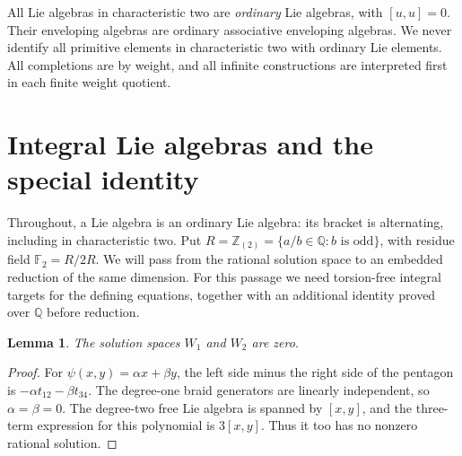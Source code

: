 \documentclass[11pt]{article}
\newcommand{\Q}{\mathbb Q}
\newcommand{\Z}{\mathbb Z}
\newcommand{\F}{{\mathbb F_2}}
\newtheorem{lemma}[theorem]{Lemma}
\theoremstyle{definition}
\theoremstyle{remark}
\numberwithin{equation}{section}
\begin{document}
All Lie algebras in characteristic two are \emph{ordinary} Lie
algebras, with \([u,u]=0\).  Their enveloping algebras are ordinary
associative enveloping algebras.  We never identify all primitive
elements in characteristic two with ordinary Lie elements.
All completions are by weight, and all infinite constructions are
interpreted first in each finite weight quotient.

\section{Integral Lie algebras and the special identity}
\label{sec:algebra}

Throughout, a Lie algebra is an ordinary Lie algebra: its bracket is
alternating, including in characteristic two.  Put
\(R=\Z_{(2)}=\{a/b\in\Q:b\text{ is odd}\}\), with residue field
\(\F=R/2R\).  We will pass from the rational solution space to an
embedded reduction of the same dimension.  For this passage we need
torsion-free integral targets for the defining equations, together with
an additional identity proved over \(\Q\) before reduction.

\begin{lemma}\label{lem:low-weights}
The solution spaces \(W_1\) and \(W_2\) are zero.
\end{lemma}
\begin{proof}
For \(\psi(x,y)=\alpha x+\beta y\), the left side minus the right side of
the pentagon is \(-\alpha t_{12}-\beta t_{34}\).  The degree-one braid
generators are linearly independent, so \(\alpha=\beta=0\).
The degree-two free Lie algebra is spanned by \([x,y]\), and the
three-term expression for this polynomial is \(3[x,y]\).  Thus it too
has no nonzero rational solution.
\end{proof}
\end{document}
